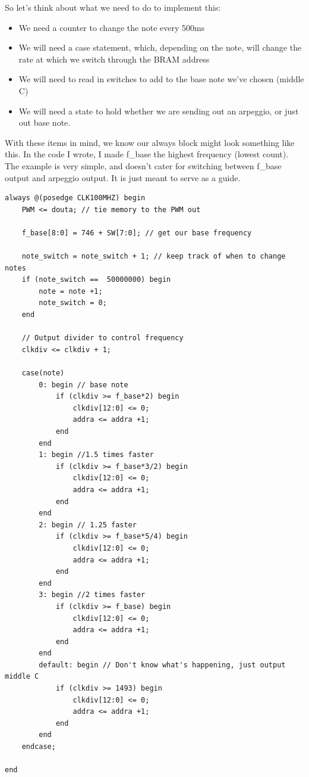 So let's think about what we need to do to implement this:
\begin{itemize}
    \item We need a counter to change the note every 500ms
    \item We will need a case statement, which, depending on the note, will change the rate at which we switch through the BRAM address
    \item We will need to read in switches to add to the base note we've chosen (middle C)
    \item We will need a state to hold whether we are sending out an arpeggio, or just out base note.
\end{itemize}

With these items in mind, we know our always block might look something like this. In the code I wrote, I made f\_base the highest frequency (lowest count). The example is very simple, and doesn't cater for switching between f\_base output and arpeggio output. It is just meant to serve as a guide.

\begin{lstlisting}[caption={Example of ``Top" for switching between notes}]
always @(posedge CLK100MHZ) begin   
    PWM <= douta; // tie memory to the PWM out
    
    f_base[8:0] = 746 + SW[7:0]; // get our base frequency
    
    note_switch = note_switch + 1; // keep track of when to change notes
    if (note_switch ==  50000000) begin
        note = note +1;
        note_switch = 0;
    end

    // Output divider to control frequency
    clkdiv <= clkdiv + 1;
    
    case(note) 
        0: begin // base note
            if (clkdiv >= f_base*2) begin
                clkdiv[12:0] <= 0;
                addra <= addra +1;
            end
        end
        1: begin //1.5 times faster
            if (clkdiv >= f_base*3/2) begin
                clkdiv[12:0] <= 0;
                addra <= addra +1;
            end
        end
        2: begin // 1.25 faster
            if (clkdiv >= f_base*5/4) begin
                clkdiv[12:0] <= 0;
                addra <= addra +1;
            end
        end
        3: begin //2 times faster
            if (clkdiv >= f_base) begin
                clkdiv[12:0] <= 0;
                addra <= addra +1;
            end
        end
        default: begin // Don't know what's happening, just output middle C
            if (clkdiv >= 1493) begin 
                clkdiv[12:0] <= 0;
                addra <= addra +1;
            end
        end
    endcase;
    
end
\end{lstlisting}

